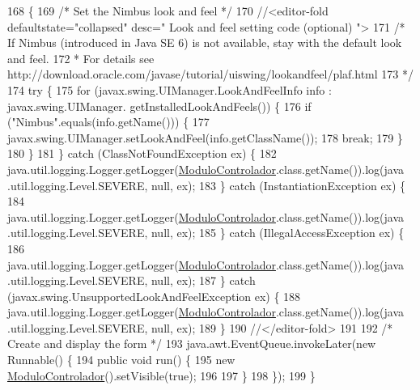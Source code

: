 \begin{DoxyCode}
168                                            \{
169         \textcolor{comment}{/* Set the Nimbus look and feel */}
170         \textcolor{comment}{//<editor-fold defaultstate="collapsed" desc=" Look and feel setting code (optional) ">}
171         \textcolor{comment}{/* If Nimbus (introduced in Java SE 6) is not available, stay with the default look and feel.}
172 \textcolor{comment}{         * For details see http://download.oracle.com/javase/tutorial/uiswing/lookandfeel/plaf.html }
173 \textcolor{comment}{         */}
174         \textcolor{keywordflow}{try} \{
175             \textcolor{keywordflow}{for} (javax.swing.UIManager.LookAndFeelInfo info : javax.swing.UIManager.
      getInstalledLookAndFeels()) \{
176                 \textcolor{keywordflow}{if} (\textcolor{stringliteral}{"Nimbus"}.equals(info.getName())) \{
177                     javax.swing.UIManager.setLookAndFeel(info.getClassName());
178                     \textcolor{keywordflow}{break};
179                 \}
180             \}
181         \} \textcolor{keywordflow}{catch} (ClassNotFoundException ex) \{
182             java.util.logging.Logger.getLogger(\mbox{\hyperlink{classpecl6part2_1_1_modulo_controlador_ae58d9d09e586f247facba0caab686943}{ModuloControlador}}.class.getName()).log(java
      .util.logging.Level.SEVERE, null, ex);
183         \} \textcolor{keywordflow}{catch} (InstantiationException ex) \{
184             java.util.logging.Logger.getLogger(\mbox{\hyperlink{classpecl6part2_1_1_modulo_controlador_ae58d9d09e586f247facba0caab686943}{ModuloControlador}}.class.getName()).log(java
      .util.logging.Level.SEVERE, null, ex);
185         \} \textcolor{keywordflow}{catch} (IllegalAccessException ex) \{
186             java.util.logging.Logger.getLogger(\mbox{\hyperlink{classpecl6part2_1_1_modulo_controlador_ae58d9d09e586f247facba0caab686943}{ModuloControlador}}.class.getName()).log(java
      .util.logging.Level.SEVERE, null, ex);
187         \} \textcolor{keywordflow}{catch} (javax.swing.UnsupportedLookAndFeelException ex) \{
188             java.util.logging.Logger.getLogger(\mbox{\hyperlink{classpecl6part2_1_1_modulo_controlador_ae58d9d09e586f247facba0caab686943}{ModuloControlador}}.class.getName()).log(java
      .util.logging.Level.SEVERE, null, ex);
189         \}
190         \textcolor{comment}{//</editor-fold>}
191 
192         \textcolor{comment}{/* Create and display the form */}
193         java.awt.EventQueue.invokeLater(\textcolor{keyword}{new} Runnable() \{
194             \textcolor{keyword}{public} \textcolor{keywordtype}{void} run() \{
195                 \textcolor{keyword}{new} \mbox{\hyperlink{classpecl6part2_1_1_modulo_controlador_ae58d9d09e586f247facba0caab686943}{ModuloControlador}}().setVisible(\textcolor{keyword}{true});
196                 
197             \}
198         \});
199     \}
\end{DoxyCode}


